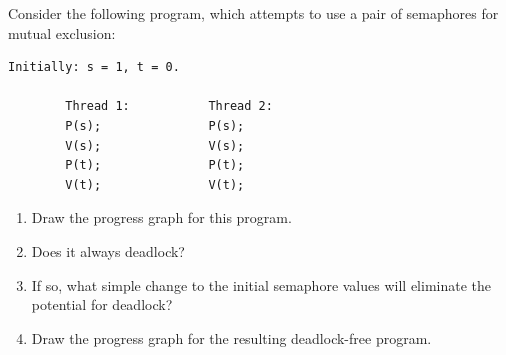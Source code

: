 \documentclass[12pt]{article}
\newenvironment{ex}[2][Exercise]{\begin{trivlist}
		\item[\hskip \labelsep {\bfseries #1}\hskip \labelsep {\bfseries #2.}]}{\end{trivlist}}
\begin{document}
\begin{ex}{12.15}
	Consider the following program, which attempts to use a pair of semaphores for mutual
	exclusion:
	\begin{lstlisting}[language={}]
		Initially: s = 1, t = 0.
		
		Thread 1:			Thread 2:
		P(s);				P(s);
		V(s);				V(s);
		P(t);				P(t);
		V(t);				V(t);
	\end{lstlisting}
	\begin{enumerate}[label=(\alph*)]
		\item Draw the progress graph for this program.
		\item Does it always deadlock?
		\item If so, what simple change to the initial semaphore values will eliminate the
		potential for deadlock?
		\item Draw the progress graph for the resulting deadlock-free program.
	\end{enumerate}
\end{ex}
\end{document}
